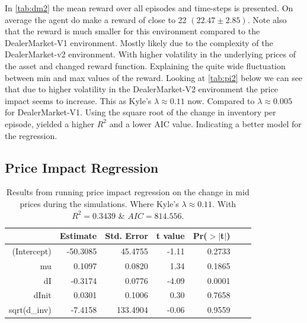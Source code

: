 \documentclass{kththesis}
\theoremstyle{definition}
\begin{document}
In \autoref{tab:dm2} the mean reward over all episodes and time-steps is presented. On average the agent do make a reward of close to 22 $(22.47 \pm 2.85)$. Note also that the reward is much smaller for this environment compared to the DealerMarket-V1 environment. Mostly likely due to the complexity of the DealerMarket-v2 environment. With higher volatility in the underlying prices of the asset and changed reward function. Explaining the quite wide fluctuation between min and max values of the reward.
\newline
\newline
Looking at \autoref{tab:pi2} below we can see that due to higher volatility in the DealerMarket-V2 environment the price impact seems to increase. This as Kyle's $\lambda \approx 0.11$ now. Compared to $\lambda \approx 0.005$ for DealerMarket-V1. Using the square root of the change in inventory per episode, yielded a higher $R^{2}$ and a lower AIC value. Indicating a better model for the regression.

\subsection*{Price Impact Regression}
\begin{table}[H]
\centering
\begin{tabular}{rrrrrrr}
  \hline
 & Estimate & Std. Error & t value & Pr($>$$|$t$|$)\\ 
 
  \hline
(Intercept) & -50.3085 & 45.4755 & -1.11 & 0.2733 \\ 
  mu & 0.1097 & 0.0820 & 1.34 & 0.1865  \\ 
  dI & -0.3174 & 0.0776 & -4.09 & 0.0001 \\ 
  dInit & 0.0301 & 0.1006 & 0.30 & 0.7658 \\ 
  sqrt(d\_inv) & -7.4158 & 133.4904 & -0.06 & 0.9559  \\ 
   \hline
\end{tabular}
\caption{Results from running price impact regression on the change in mid prices during the simulations. Where Kyle's $\lambda \approx 0.11$. With $R^{2}= 0.3439$ \& $AIC =  814.556$.}
\label{tab:pi2}
\end{table}
\end{document}
